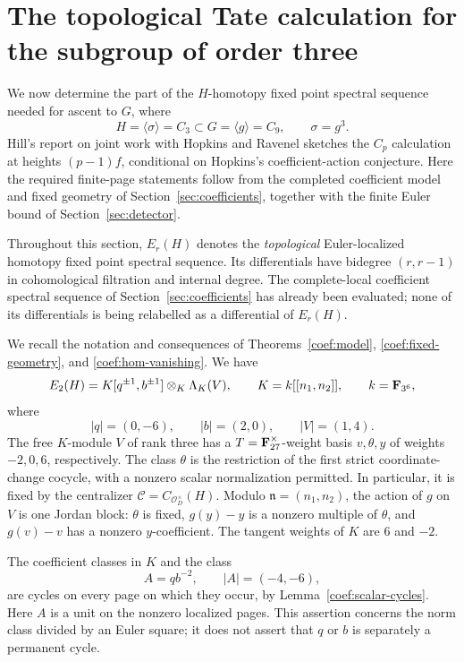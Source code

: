 \section{The topological Tate calculation for the subgroup of order three}
\label{sec:subgroup}

We now determine the part of the $H$-homotopy fixed point spectral sequence
needed for ascent to $G$, where
\[
 H=\langle\sigma\rangle=C_3\subset G=\langle g\rangle=C_9,
 \qquad \sigma=g^3.
\]
Hill's report on joint work with Hopkins and Ravenel
\cite[pp.~2699--2700, Propositions~2--3]{Hill2007} sketches the
$C_p$ calculation at heights $(p-1)f$, conditional on Hopkins's
coefficient-action conjecture. Here the required finite-page statements
follow from the completed coefficient model and fixed geometry of
Section~\ref{sec:coefficients}, together with the finite Euler bound of
Section~\ref{sec:detector}.

Throughout this section, $E_r(H)$ denotes the \emph{topological}
Euler-localized homotopy fixed point spectral sequence. Its differentials have
bidegree $(r,r-1)$ in cohomological filtration and internal degree. The
complete-local coefficient spectral sequence of
Section~\ref{sec:coefficients} has already been evaluated; none of its
differentials is being relabelled as a differential of $E_r(H)$.

We recall the notation and consequences of
Theorems~\ref{coef:model}, \ref{coef:fixed-geometry}, and
\ref{coef:hom-vanishing}. We have
\begin{equation}
 \label{h:e2}
 E_2(H)=K[q^{\pm1},b^{\pm1}]\otimes_K\Lambda_K(V),
 \qquad K=k[[n_1,n_2]],\qquad k=\mathbf F_{3^6},
\end{equation}
where
\[
 |q|=(0,-6),\qquad |b|=(2,0),\qquad |V|=(1,4).
\]
The free $K$-module $V$ of rank three has a $T=\mathbf F_{27}^{\times}$-weight
basis $v,\theta,y$ of weights $-2,0,6$, respectively. The class $\theta$ is
the restriction of the first strict coordinate-change cocycle, with a
nonzero scalar normalization permitted. In particular, it is fixed by the
centralizer $\mathcal C=C_{\mathcal O_D^\times}(H)$. Modulo
$\mathfrak n=(n_1,n_2)$, the action of $g$ on $V$ is one Jordan block:
$\theta$ is fixed, $g(y)-y$ is a nonzero multiple of $\theta$, and
$g(v)-v$ has a nonzero $y$-coefficient. The tangent weights of $K$ are $6$
and $-2$.

The coefficient classes in $K$ and the class
\begin{equation}
 \label{h:a}
 A=qb^{-2},\qquad |A|=(-4,-6),
\end{equation}
are cycles on every page on which they occur, by
Lemma~\ref{coef:scalar-cycles}. Here $A$ is a unit on the nonzero
localized pages. This assertion concerns the norm class divided by an
Euler square; it does not assert that $q$ or $b$ is separately a permanent
cycle.

